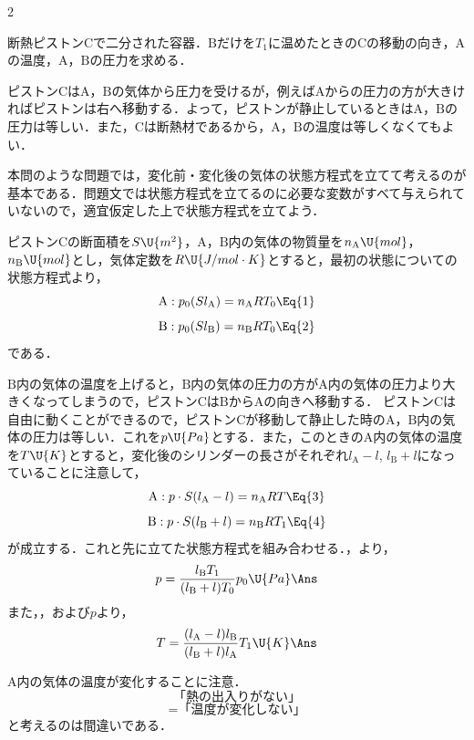 \begin{multicols}{2}
\begin{saikei}
断熱ピストン$\mathrm{C}$で二分された容器．$\mathrm{B}$だけを$T_1$に温めたときの$\mathrm{C}$の移動の向き，$\mathrm{A}$の温度，$\mathrm{A}$，$\mathrm{B}$の圧力を求める．
\end{saikei}
\begin{sisin}
ピストン$\mathrm{C}$は$\mathrm{A}$，$\mathrm{B}$の気体から圧力を受けるが，例えば$\mathrm{A}$からの圧力の方が大きければピストンは右へ移動する．よって，ピストンが静止しているときは$\mathrm{A}$，$\mathrm{B}$の圧力は等しい．また，$\mathrm{C}$は断熱材であるから，$\mathrm{A}$，$\mathrm{B}$の温度は等しくなくてもよい．

本問のような問題では，変化前・変化後の気体の状態方程式を立てて考えるのが基本である．問題文では状態方程式を立てるのに必要な変数がすべて与えられていないので，適宜仮定した上で状態方程式を立てよう．
\end{sisin}
\begin{kaitou}
\hspace{1zw}ピストン$\mathrm{C}$の断面積を$S\U{m^2}$，$\mathrm{A}$，$\mathrm{B}$内の気体の物質量を$n_{\mathrm{A}}\U{mol}$，$n_{\mathrm{B}}\U{mol}$とし，気体定数を$R\U{J/mol\cdot K}$とすると，最初の状態についての状態方程式より，
\[\mathrm{A}:p_0(Sl_{\mathrm{A}})=n_{\mathrm{A}}RT_0\Eq{1}\]
\[\mathrm{B}:p_0(Sl_{\mathrm{B}})=n_{\mathrm{B}}RT_0\Eq{2}\]
である．
\begin{komon}
 $\mathrm{B}$内の気体の温度を上げると，$\mathrm{B}$内の気体の圧力の方が$\mathrm{A}$内の気体の圧力より大きくなってしまうので，ピストン$\mathrm{C}$は$\mathrm{B}$から$\mathrm{A}$の向きへ移動する．\Ans
{} ピストン$\mathrm{C}$は自由に動くことができるので，ピストン$\mathrm{C}$が移動して静止した時の$\mathrm{A}$，$\mathrm{B}$内の気体の圧力は等しい．これを$p\U{Pa}$とする．また，このときの$\mathrm{A}$内の気体の温度を$T\U{K}$とすると，変化後のシリンダーの長さがそれぞれ$l_{\mathrm{A}}-l$, $l_{\mathrm{B}}+l$になっていることに注意して，
       \[\mathrm{A}:p\cdot S(l_{\mathrm{A}}-l)=n_{\mathrm{A}}RT\Eq{3}\]
       \[\mathrm{B}:p\cdot S(l_{\mathrm{B}}+l)=n_{\mathrm{B}}RT_1\Eq{4}\]
       が成立する．これと先に立てた状態方程式を組み合わせる．，より，
       \[p=\frac{l_{\mathrm{B}}T_1}{(l_{\mathrm{B}}+l)T_0}p_0\U{Pa}\Ans\]
       また，，および$p$より，
       \[T=\frac{(l_{\mathrm{A}}-l)l_{\mathrm{B}}}{(l_{\mathrm{B}}+l)l_{\mathrm{A}}}T_1\U{K}\Ans\]
\end{komon}
\end{kaitou}
\begin{chuu}
\hspace{1zw}$\mathrm{A}$内の気体の温度が変化することに注意．
\[\mbox{「熱の出入りがない」}\]
\[=\mbox{「温度が変化しない」}\]
と考えるのは間違いである．
\end{chuu}


\end{multicols}
